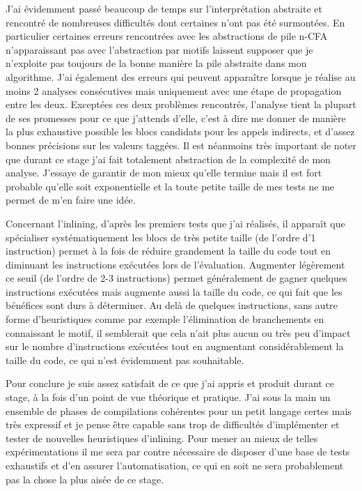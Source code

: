 \documentclass{beamer}
\begin{document}
J'ai évidemment passé beaucoup de temps sur l'interprétation abstraite et rencontré de nombreuses difficultés dont certaines n'ont pas été surmontées. En particulier certaines erreurs rencontrées avec les abstractions de pile n-CFA n'apparaissant pas avec l'abstraction par motifs laissent supposer que je n'exploite pas toujours de la bonne manière la pile abstraite dans mon algorithme. J'ai également des erreurs qui peuvent apparaître lorsque je réalise au moins 2 analyses consécutives mais uniquement avec une étape de propagation entre les deux. Exceptées ces deux problèmes rencontrés, l'analyse tient la plupart de ses promesses pour ce que j'attends d'elle, c'est à dire me donner de manière la plus exhaustive possible les blocs candidats pour les appels indirects, et d'assez bonnes précisions sur les valeurs taggées. Il est néanmoins très important de noter que durant ce stage j'ai fait totalement abstraction de la complexité de mon analyse. J'essaye de garantir de mon mieux qu'elle termine mais il est fort probable qu'elle soit exponentielle et la toute petite taille de mes tests ne me permet de m'en faire une idée.

Concernant l'inlining, d'après les premiers tests que j'ai réalisés, il apparaît que spécialiser systématiquement les blocs de très petite taille (de l'ordre d'1 instruction) permet à la fois de réduire grandement la taille du code tout en diminuant les instructions exécutées lors de l'évaluation. Augmenter légèrement ce seuil (de l'ordre de 2-3 instructions) permet généralement de gagner quelques instructions exécutées mais augmente aussi la taille du code, ce qui fait que les bénéfices sont durs à déterminer. Au delà de quelques instructions, sans autre forme d'heuristiques comme par exemple l'élimination de branchements en connaissant le motif, il semblerait que cela n'ait plus aucun ou très peu d'impact sur le nombre d'instructions exécutées tout en augmentant considérablement la taille du code, ce qui n'est évidemment pas souhaitable.

Pour conclure je suis assez satisfait de ce que j'ai appris et produit durant ce stage, à la fois d'un point de vue théorique et pratique. J'ai sous la main un ensemble de phases de compilations cohérentes pour un petit langage certes mais très expressif et je pense être capable sans trop de difficultés d'implémenter et tester de nouvelles heuristiques d'inlining. Pour mener au mieux de telles expérimentations il me sera par contre nécessaire de disposer d'une base de tests exhaustifs et d'en assurer l'automatisation, ce qui en soit ne sera probablement pas la chose la plus aisée de ce stage.
\end{document}
